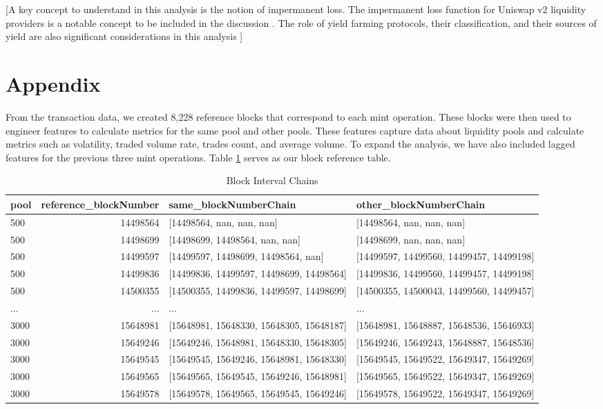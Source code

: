 \documentclass{article}
\begin{document}
[A key concept to understand in this analysis is the notion of impermanent loss. The impermanent loss function for Uniswap v2 liquidity providers is a notable concept to be included in the discussion \cite{Aigner2021}. The role of yield farming protocols, their classification, and their sources of yield are also significant considerations in this analysis \cite{Xu2023}]

\section*{Appendix}

From the transaction data, we created 8,228 reference blocks that correspond to each mint operation. These blocks were then used to engineer features to calculate metrics for the same pool and other pools. These features capture data about liquidity pools and calculate metrics such as volatility, traded volume rate, trades count, and average volume. To expand the analysis, we have also included lagged features for the previous three mint operations. Table \ref{table:chains} serves as our block reference table.
\begin{table}[htbp]
  \centering
  \small
  \begin{tabularx}{\linewidth}{|X|r|l|l|}
    \hline
    \textbf{pool} & \textbf{reference\_blockNumber} & \textbf{same\_blockNumberChain} & \textbf{other\_blockNumberChain} \\
    \hline
    500 & 14498564 & [14498564, nan, nan, nan] & [14498564, nan, nan, nan] \\
    500 & 14498699 & [14498699, 14498564, nan, nan] & [14498699, nan, nan, nan] \\
    500 & 14499597 & [14499597, 14498699, 14498564, nan] & [14499597, 14499560, 14499457, 14499198] \\
    500 & 14499836 & [14499836, 14499597, 14498699, 14498564] & [14499836, 14499560, 14499457, 14499198] \\
    500 & 14500355 & [14500355, 14499836, 14499597, 14498699] & [14500355, 14500043, 14499560, 14499457] \\
    ... & ... & ... & ... \\
    3000 & 15648981 & [15648981, 15648330, 15648305, 15648187] & [15648981, 15648887, 15648536, 15646933] \\
    3000 & 15649246 & [15649246, 15648981, 15648330, 15648305] & [15649246, 15649243, 15648887, 15648536] \\
    3000 & 15649545 & [15649545, 15649246, 15648981, 15648330] & [15649545, 15649522, 15649347, 15649269] \\
    3000 & 15649565 & [15649565, 15649545, 15649246, 15648981] & [15649565, 15649522, 15649347, 15649269] \\
    3000 & 15649578 & [15649578, 15649565, 15649545, 15649246] & [15649578, 15649522, 15649347, 15649269] \\
    \hline
  \end{tabularx}
  \caption{Block Interval Chains}
  \label{table:chains}
\end{table}
\end{document}

